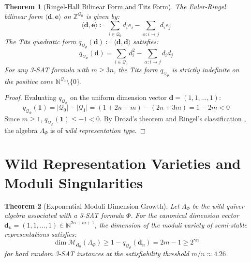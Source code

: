 \documentclass[11pt,a4paper]{article}
\newtheorem{theorem}{Theorem}[section]
\theoremstyle{definition}
\begin{document}
\begin{theorem}[Ringel-Hall Bilinear Form and Tits Form]\label{thm:tits_form}
The Euler-Ringel bilinear form $\langle \mathbf{d}, \mathbf{e} \rangle$ on $\mathbb{Z}^{\mathcal{Q}_0}$ is given by:
\begin{equation}
\langle \mathbf{d}, \mathbf{e} \rangle \coloneqq \sum_{i \in \mathcal{Q}_0} d_i e_i - \sum_{\alpha : i \to j} d_i e_j
\end{equation}
The Tits quadratic form $q_{\mathcal{Q}_\Phi}(\mathbf{d}) \coloneqq \langle \mathbf{d}, \mathbf{d} \rangle$ satisfies:
\begin{equation}\label{eq:tits_def}
q_{\mathcal{Q}_\Phi}(\mathbf{d}) = \sum_{i \in \mathcal{Q}_0} d_i^2 - \sum_{\alpha : i \to j} d_i d_j
\end{equation}
For any 3-SAT formula with $m \ge 3n$, the Tits form $q_{\mathcal{Q}_\Phi}$ is strictly indefinite on the positive cone $\mathbb{N}^{\mathcal{Q}_0} \setminus \{0\}$.
\end{theorem}

\begin{proof}
Evaluating $q_{\mathcal{Q}_\Phi}$ on the uniform dimension vector $\mathbf{d} = (1, 1, \dots, 1)$:
\begin{equation}
q_{\mathcal{Q}_\Phi}(\mathbf{1}) = |\mathcal{Q}_0| - |\mathcal{Q}_1| = (1 + 2n + m) - (2n + 3m) = 1 - 2m < 0
\end{equation}
Since $m \ge 1$, $q_{\mathcal{Q}_\Phi}(\mathbf{1}) \le -1 < 0$. By Drozd's theorem \cite{drozd1980} and Ringel's classification \cite{ringel1984}, the algebra $\Lambda_\Phi$ is of \emph{wild representation type}.
\end{proof}

\section{Wild Representation Varieties and Moduli Singularities}
\begin{theorem}[Exponential Moduli Dimension Growth]\label{thm:moduli_exponential}
Let $\Lambda_\Phi$ be the wild quiver algebra associated with a 3-SAT formula $\Phi$. For the canonical dimension vector $\mathbf{d}_n = (1, 1, \dots, 1) \in \mathbb{N}^{2n+m+1}$, the dimension of the moduli variety of semi-stable representations satisfies:
\begin{equation}\label{eq:moduli_growth}
\dim \mathcal{M}_{\mathbf{d}_n}(\Lambda_\Phi) \ge 1 - q_{\mathcal{Q}_\Phi}(\mathbf{d}_n) = 2m - 1 \ge 2^{\gamma n}
\end{equation}
for hard random 3-SAT instances at the satisfiability threshold $m/n \approx 4.26$.
\end{theorem}
\end{document}
